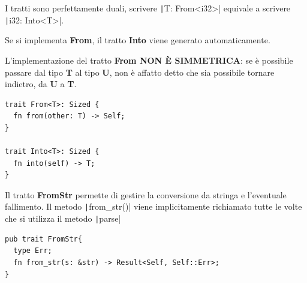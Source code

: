 I tratti sono perfettamente duali, scrivere \texttt|T: From<i32>| equivale a scrivere \texttt|i32: Into<T>|.

Se si implementa \textbf{From}, il tratto \textbf{Into} viene generato automaticamente.

L'implementazione del tratto \textbf{From NON È SIMMETRICA}: se è possibile passare
dal tipo \textbf{T} al tipo \textbf{U}, non è affatto detto che sia possibile
tornare indietro, da \textbf{U} a \textbf{T}.

\begin{verbatim}
trait From<T>: Sized {
  fn from(other: T) -> Self;
}

trait Into<T>: Sized {
  fn into(self) -> T;
}
\end{verbatim}

Il tratto \textbf{FromStr} permette di gestire la conversione da stringa e l'eventuale
fallimento. Il metodo \texttt|from_str()| viene implicitamente richiamato
tutte le volte che si utilizza il metodo \texttt|parse|

\begin{verbatim}
pub trait FromStr{
  type Err;
  fn from_str(s: &str) -> Result<Self, Self::Err>;
}
\end{verbatim}






